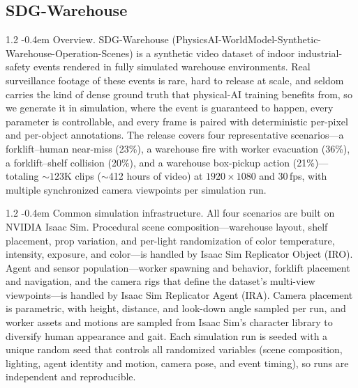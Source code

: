 \documentclass{llmxive}
\makeatletter
\providecommand{\paragraph}{  \@startsection{paragraph}{4}{\z@}    {1\baselineskip \@plus .2\baselineskip}    {-0.4em}    {\normalfont\normalsize\bfseries}}
\makeatother
\begin{document}
\subsection{SDG-Warehouse}
\label{appendix:sdg_warehouse}

\paragraph{Overview.}
SDG-Warehouse (PhysicsAI-WorldModel-Synthetic-Warehouse-Operation-Scenes) is a synthetic video dataset of indoor industrial-safety events rendered in fully simulated warehouse environments. Real surveillance footage of these events is rare, hard to release at scale, and seldom carries the kind of dense ground truth that physical-AI training benefits from, so we generate it in simulation, where the event is guaranteed to happen, every parameter is controllable, and every frame is paired with deterministic per-pixel and per-object annotations. The release covers four representative scenarios---a forklift--human near-miss (23\%), a warehouse fire with worker evacuation (36\%), a forklift--shelf collision (20\%), and a warehouse box-pickup action (21\%)---totaling ${\sim}123$K clips ($\sim$412 hours of video) at $1920{\times}1080$ and $30$\,fps, with multiple synchronized camera viewpoints per simulation run.

\paragraph{Common simulation infrastructure.}
All four scenarios are built on NVIDIA Isaac Sim. Procedural scene composition---warehouse layout, shelf placement, prop variation, and per-light randomization of color temperature, intensity, exposure, and color---is handled by Isaac Sim Replicator Object (IRO). Agent and sensor population---worker spawning and behavior, forklift placement and navigation, and the camera rigs that define the dataset's multi-view viewpoints---is handled by Isaac Sim Replicator Agent (IRA). Camera placement is parametric, with height, distance, and look-down angle sampled per run, and worker assets and motions are sampled from Isaac Sim's character library to diversify human appearance and gait. Each simulation run is seeded with a unique random seed that controls all randomized variables (scene composition, lighting, agent identity and motion, camera pose, and event timing), so runs are independent and reproducible.
\end{document}
